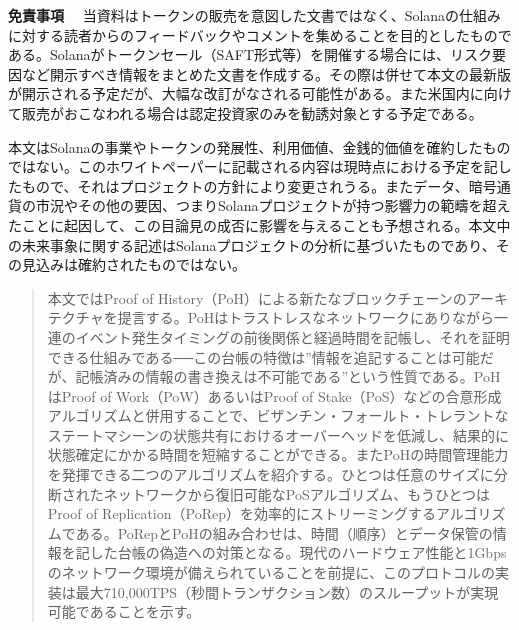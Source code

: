 \documentclass[12pt]{ltjsarticle}
\begin{document}
\maketitle

\textbf{\footnotesize 免責事項}\scriptsize
~~当資料はトークンの販売を意図した文書ではなく、Solanaの仕組みに対する読者からのフィードバックやコメントを集めることを目的としたものである。Solanaがトークンセール（SAFT形式等）を開催する場合には、リスク要因など開示すべき情報をまとめた文書を作成する。その際は併せて本文の最新版が開示される予定だが、大幅な改訂がなされる可能性がある。また米国内に向けて販売がおこなわれる場合は認定投資家のみを勧誘対象とする予定である。

本文はSolanaの事業やトークンの発展性、利用価値、金銭的価値を確約したものではない。このホワイトペーパーに記載される内容は現時点における予定を記したもので、それはプロジェクトの方針により変更されうる。またデータ、暗号通貨の市況やその他の要因、つまりSolanaプロジェクトが持つ影響力の範疇を超えたことに起因して、この目論見の成否に影響を与えることも予想される。本文中の未来事象に関する記述はSolanaプロジェクトの分析に基づいたものであり、その見込みは確約されたものではない。

\begin{abstract}
本文ではProof of History（PoH）による新たなブロックチェーンのアーキテクチャを提言する。PoHはトラストレスなネットワークにありながら一連のイベント発生タイミングの前後関係と経過時間を記帳し、それを証明できる仕組みである──この台帳の特徴は”情報を追記することは可能だが、記帳済みの情報の書き換えは不可能である”という性質である。PoHはProof of Work（PoW）あるいはProof of Stake（PoS）などの合意形成アルゴリズムと併用することで、ビザンチン・フォールト・トレラントなステートマシーンの状態共有におけるオーバーヘッドを低減し、結果的に状態確定にかかる時間を短縮することができる。またPoHの時間管理能力を発揮できる二つのアルゴリズムを紹介する。ひとつは任意のサイズに分断されたネットワークから復旧可能なPoSアルゴリズム、もうひとつはProof of Replication（PoRep）を効率的にストリーミングするアルゴリズムである。PoRepとPoHの組み合わせは、時間（順序）とデータ保管の情報を記した台帳の偽造への対策となる。現代のハードウェア性能と1Gbpsのネットワーク環境が備えられていることを前提に、このプロトコルの実装は最大710,000TPS（秒間トランザクション数）のスループットが実現可能であることを示す。
\end{abstract}
\end{document}
